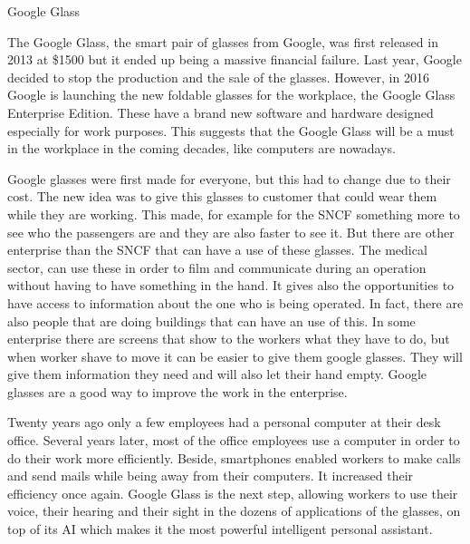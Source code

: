 \documentclass[a4paper,12pt]{article}
\begin{document}
\begin{center}
\huge
Google Glass
\end{center}

The Google Glass, the smart pair of glasses from Google, was first released in 2013 at \$1500 but it ended up being a massive financial failure. Last year, Google decided to stop the production and the sale of the glasses. However, in 2016 Google is launching the new foldable glasses for the workplace, the Google Glass Enterprise Edition. These have a brand new software and hardware designed especially for work purposes. This suggests that the Google Glass will be a must in the workplace in the coming decades, like computers are nowadays.

Google glasses were first made for everyone, but this had to change due to their cost. The new idea was to give this glasses to customer that could wear them while they are working. This made, for example for the SNCF something more to see who the passengers are and they are also faster to see it. 
But there are other enterprise than the SNCF that can have a use of these glasses. The medical sector, can use these in order to film and communicate during an operation without having to have something in the hand. It gives also the opportunities to have access to information about the one who is being operated.
In fact, there are also people that are doing buildings that can have an use of this. In some enterprise there are screens that show to the workers what they have to do, but when worker shave to move it can be easier to give them google glasses. They will give them information they need and will also let their hand empty. Google glasses are a good way to improve the work in the enterprise.

Twenty years ago only a few employees had a personal computer at their desk office. Several years later, most of the office employees use a computer in order to do their work more efficiently. Beside, smartphones enabled workers to make calls and send mails while being away from their computers. It increased their efficiency once again. Google Glass is the next step, allowing workers to use their voice, their hearing and their sight in the dozens of applications of the glasses, on top of its AI which makes it the most powerful intelligent personal assistant.
\end{document}
